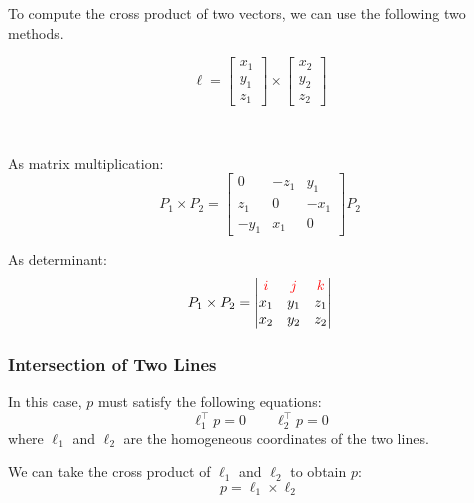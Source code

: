 \begin{remark}
    To compute the cross product of two vectors, we can use the following two methods. 

    \[
        \ell = \begin{bmatrix}
            x_1 \\ y_1 \\ z_1
        \end{bmatrix} \times \begin{bmatrix}
            x_2 \\ y_2 \\ z_2
        \end{bmatrix}
    \]

    {~~~}

    \begin{minipage}[t]{0.45\linewidth}
        As matrix multiplication: \[
            P_1 \times P_2 = \begin{bmatrix}
                0 & -z_1 & y_1 \\
                z_1 & 0 & -x_1 \\
                -y_1 & x_1 & 0
            \end{bmatrix} P_2
        \]
    \end{minipage}%
    \hfil%
    \begin{minipage}[t]{0.45\linewidth}
        As determinant: \[
            P_1 \times P_2 = \left| 
                \begin{matrix}
                    \color{red} i & \color{red} j & \color{red} k \\
                    x_1 & y_1 & z_1 \\
                    x_2 & y_2 & z_2
                \end{matrix}
            \right|
        \]
    \end{minipage}
\end{remark}

\subsubsection{Intersection of Two Lines}

In this case, $p$ must satisfy the following equations: \[
    \ell_1^\top p = 0 \qquad \ell_2^\top p = 0
\] where $\ell_1$ and $\ell_2$ are the homogeneous coordinates of the two lines.

We can take the cross product of $\ell_1$ and $\ell_2$ to obtain $p$: \[
    p = \ell_1 \times \ell_2
\]

